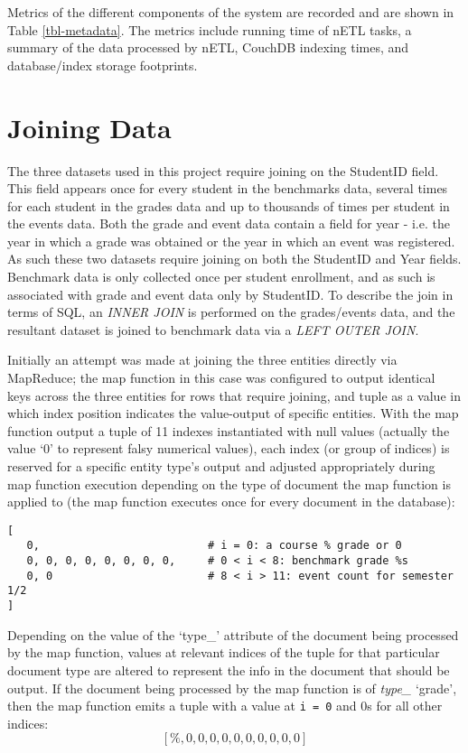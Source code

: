 Metrics of the different components of the system are recorded and are shown in Table \ref{tbl-metadata}. The metrics include running time of nETL tasks, a summary of the data processed by nETL, CouchDB indexing times, and database/index storage footprints.



\section{Joining Data}
The three datasets used in this project require joining on the StudentID field. This field appears once for every student in the benchmarks data, several times for each student in the grades data and up to thousands of times per student in the events data. Both the grade and event data contain a field for year - i.e. the year in which a grade was obtained or the year in which an event was registered. As such these two datasets require joining on both the StudentID and Year fields. Benchmark data is only collected once per student enrollment, and as such is associated with grade and event data only by StudentID. To describe the join in terms of SQL, an \textit{INNER JOIN} is performed on the grades/events data, and the resultant dataset is joined to benchmark data via a \textit{LEFT OUTER JOIN}.

Initially an attempt was made at joining the three entities directly via MapReduce; the map function in this case was configured to output identical keys across the three entities for rows that require joining, and tuple as a value in which index position indicates the value-output of specific entities. With the map function output a tuple of 11 indexes instantiated with null values (actually the value `0' to represent falsy numerical values), each index (or group of indices) is reserved for a specific entity type's output and adjusted appropriately during map function execution depending on the type of document the map function is applied to (the map function executes once for every document in the database):

\begin{verbatim}
[
   0,                          # i = 0: a course % grade or 0
   0, 0, 0, 0, 0, 0, 0, 0,     # 0 < i < 8: benchmark grade %s
   0, 0                        # 8 < i > 11: event count for semester 1/2
]
\end{verbatim}

Depending on the value of the `type\_' attribute of the document being processed by the map function, values at relevant indices of the tuple for that particular document type are altered to represent the info in the document that should be output. If the document being processed by the map function is of \textit{type\_} ‘grade’, then the map function emits a tuple with a value at \texttt{i = 0} and 0s for all other indices: \[[\%, 0, 0, 0, 0, 0, 0, 0, 0, 0, 0]\]

